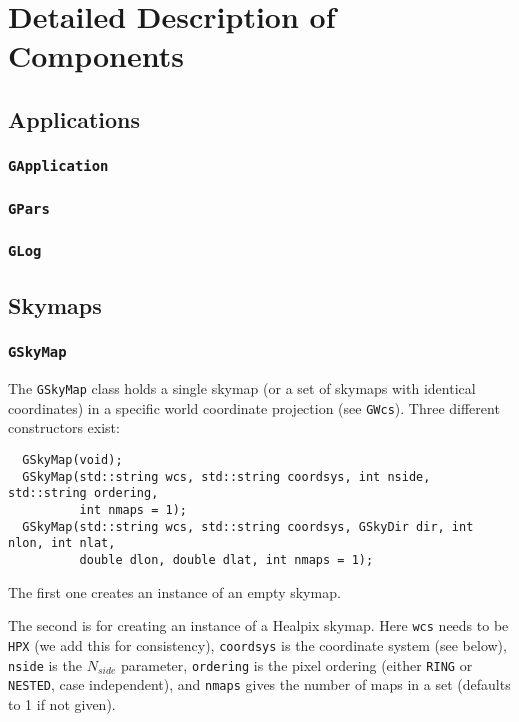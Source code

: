 \documentclass{article}[12pt,a4]
\begin{document}
\section{Detailed Description of Components}

\subsection{Applications}

\subsubsection{{\tt GApplication}}

\subsubsection{{\tt GPars}}

\subsubsection{{\tt GLog}}


\subsection{Skymaps}

\subsubsection{{\tt GSkyMap}}

The {\tt GSkyMap} class holds a single skymap (or a set of skymaps with identical coordinates)
in a specific world coordinate projection (see {\tt GWcs}).
Three different constructors exist:
\begin{verbatim}
  GSkyMap(void);
  GSkyMap(std::string wcs, std::string coordsys, int nside, std::string ordering,
          int nmaps = 1);
  GSkyMap(std::string wcs, std::string coordsys, GSkyDir dir, int nlon, int nlat, 
          double dlon, double dlat, int nmaps = 1);
\end{verbatim}
The first one creates an instance of an empty skymap.

The second is for creating an instance of a Healpix skymap.
Here
{\tt wcs} needs to be {\tt HPX} (we add this for consistency),
{\tt coordsys} is the coordinate system (see below),
{\tt nside} is the $N_{side}$ parameter,
{\tt ordering} is the pixel ordering (either {\tt RING} or {\tt NESTED}, case independent),
and
{\tt nmaps} gives the number of maps in a set (defaults to 1 if not given).
\end{document}
